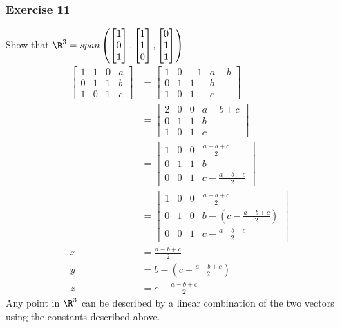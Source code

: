 \documentclass[letterpaper, 12pt]{math}
\begin{document}
\subsubsection*{Exercise 11}
Show that \( \R^3 = span\left(\begin{bmatrix}1 \\ 0 \\ 1\end{bmatrix},
\begin{bmatrix}1 \\ 1 \\0\end{bmatrix},\begin{bmatrix}0 \\ 1 \\ 1\end{bmatrix}
\right) \)
\begin{align*}
  \begin{bmatrix}
    1 & 1 & 0 & a \\
    0 & 1 & 1 & b \\
    1 & 0 & 1 & c
  \end{bmatrix} &= \begin{bmatrix}
    1 & 0 & -1 & a-b \\
    0 & 1 & 1 & b \\
    1 & 0 & 1 & c
  \end{bmatrix} \\
  &= \begin{bmatrix}
    2 & 0 & 0 & a-b+c \\
    0 & 1 & 1 & b \\
    1 & 0 & 1 & c
  \end{bmatrix} \\
  &= \begin{bmatrix}
    1 & 0 & 0 & \frac{a-b+c}{2} \\
    0 & 1 & 1 & b \\
    0 & 0 & 1 & c-\frac{a-b+c}{2}
  \end{bmatrix} \\
  &= \begin{bmatrix}
    1 & 0 & 0 & \frac{a-b+c}{2} \\
    0 & 1 & 0 & b-(c-\frac{a-b+c}{2}) \\
    0 & 0 & 1 & c-\frac{a-b+c}{2}
  \end{bmatrix} \\
  x &= \frac{a-b+c}{2} \\
  y &= b-(c-\frac{a-b+c}{2}) \\
  z &= c-\frac{a-b+c}{2}
\end{align*}
Any point in \( \R^3 \) can be described by a linear combination of the two
vectors using the constants described above.
\end{document}
